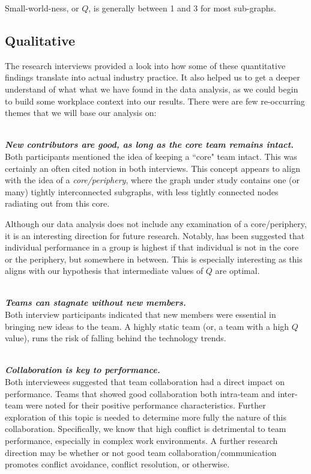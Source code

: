 \documentclass{proc}
\begin{document}
Small-world-ness, or $Q$, is generally between 1 and 3 for most sub-graphs.


\subsection{Qualitative}
The research interviews provided a look into how some of these quantitative findings translate into actual industry practice. It also helped us to get a deeper understand of what what we have found in the data analysis, as we could begin to build some workplace context into our results. There were are few re-occurring themes that we will base our analysis on\cite{stmartin_interview,stmartin_interview}:

\noindent\\\textit{\textbf{New contributors are good, as long as the core team remains intact.}}\\
Both participants mentioned the idea of keeping a ``core" team intact. This was certainly an often cited notion in both interviews. This concept appears to align with the idea of a \textit{core/periphery}\cite{borgatti2000models}, where the graph under study contains one (or many) tightly interconnected subgraphs, with less tightly connected nodes radiating out from this core.

Although our data analysis does not include any examination of a core/periphery, it is an interesting direction for future research. Notably, has been suggested that individual performance in a group is highest if that individual is not in the core or the periphery, but somewhere in between\cite{cattani2008core}. This is especially interesting as this aligns with our hypothesis that intermediate values of $Q$ are optimal.

\noindent\\\textit{\textbf{Teams can stagnate without new members.}}\\
Both interview participants indicated that new members were essential in bringing new ideas to the team. A highly static team (or, a team with a high $Q$ value), runs the risk of falling behind the technology trends.

\noindent\\\textit{\textbf{Collaboration is key to performance.}}\\
Both interviewees suggested that team collaboration had a direct impact on performance. Teams that showed good collaboration both intra-team and inter-team were noted for their positive performance characteristics. Further exploration of this topic is needed to determine more fully the nature of this collaboration. Specifically, we know that high conflict is detrimental to team performance, especially in complex work environments\cite{de2003task}. A further research direction may be whether or not good team collaboration/communication promotes conflict avoidance, conflict resolution, or otherwise.
\end{document}
